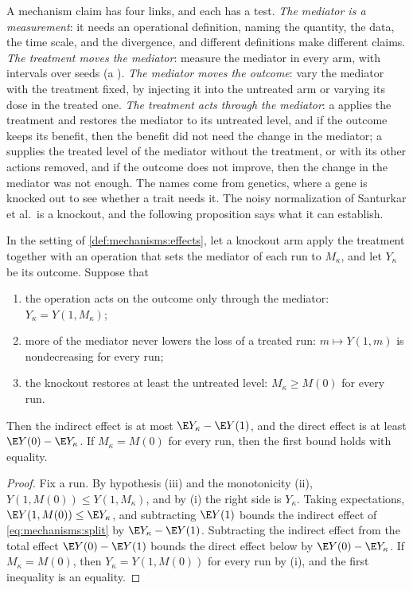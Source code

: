 \begin{refsection}
A mechanism claim has four links, and each has a test. \emph{The mediator is a measurement}: it needs an operational definition, naming the quantity, the data, the time scale, and the divergence, and different definitions make different claims. \emph{The treatment moves the mediator}: measure the mediator in every arm, with intervals over seeds (a ). \emph{The mediator moves the outcome}: vary the mediator with the treatment fixed, by injecting it into the untreated arm or varying its dose in the treated one. \emph{The treatment acts through the mediator}: a  applies the treatment and restores the mediator to its untreated level, and if the outcome keeps its benefit, then the benefit did not need the change in the mediator; a  supplies the treated level of the mediator without the treatment, or with its other actions removed, and if the outcome does not improve, then the change in the mediator was not enough. The names come from genetics, where a gene is knocked out to see whether a trait needs it. The noisy normalization of Santurkar et al.\ is a knockout, and the following proposition says what it can establish.

\begin{proposition}\label{prop:mechanisms:knockout}
In the setting of \cref{def:mechanisms:effects}, let a knockout arm apply the treatment together with an operation that sets the mediator of each run to $M_\kappa$, and let $Y_\kappa$ be its outcome. Suppose that
\begin{enumerate}
\item the operation acts on the outcome only through the mediator: $Y_\kappa=Y(1,M_\kappa)$;
\item more of the mediator never lowers the loss of a treated run: $m\mapsto Y(1,m)$ is nondecreasing for every run;
\item the knockout restores at least the untreated level: $M_\kappa\ge M(0)$ for every run.
\end{enumerate}
Then the indirect effect is at most $\E Y_\kappa-\E Y(1)$, and the direct effect is at least $\E Y(0)-\E Y_\kappa$. If $M_\kappa=M(0)$ for every run, then the first bound holds with equality.
\end{proposition}

\begin{proof}
Fix a run. By hypothesis (iii) and the monotonicity (ii), $Y(1,M(0))\le Y(1,M_\kappa)$, and by (i) the right side is $Y_\kappa$. Taking expectations, $\E Y(1,M(0))\le\E Y_\kappa$, and subtracting $\E Y(1)$ bounds the indirect effect of \eqref{eq:mechanisms:split} by $\E Y_\kappa-\E Y(1)$. Subtracting the indirect effect from the total effect $\E Y(0)-\E Y(1)$ bounds the direct effect below by $\E Y(0)-\E Y_\kappa$. If $M_\kappa=M(0)$, then $Y_\kappa=Y(1,M(0))$ for every run by (i), and the first inequality is an equality.
\end{proof}


\end{refsection}
